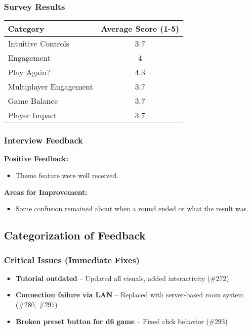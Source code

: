 \documentclass{article}
\begin{document}
\subsubsection{Survey Results}
\begin{longtable}{|p{7cm}|c|}
\hline
\textbf{Category} & \textbf{Average Score (1-5)} \\
\hline
Intuitive Controls & 3.7 \\
\hline
Engagement & 4 \\
\hline
Play Again? & 4.3 \\
\hline
Multiplayer Engagement & 3.7 \\
\hline
Game Balance & 3.7 \\
\hline
Player Impact & 3.7 \\
\hline
\end{longtable}

\subsubsection{Interview Feedback}

\textbf{Positive Feedback:}
\begin{itemize}
    \item Theme feature were well received.
\end{itemize}

\textbf{Areas for Improvement:}
\begin{itemize}
    \item Some confusion remained about when a round ended or what the result was.
\end{itemize}


\subsection{Categorization of Feedback}

\subsubsection{Critical Issues (Immediate Fixes)}
\begin{itemize}
    \item \textbf{Tutorial outdated} – Updated all visuals, added interactivity (\#272)
    \item \textbf{Connection failure via LAN} – Replaced with server-based room system (\#280, \#297)
    \item \textbf{Broken preset button for d6 game} – Fixed click behavior (\#293)
\end{itemize}
\end{document}
